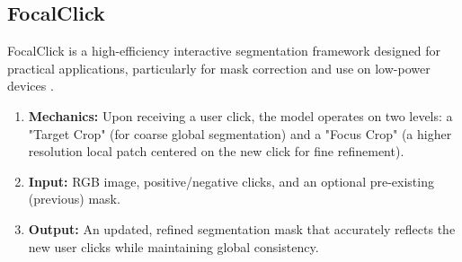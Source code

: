 \subsection{FocalClick}
FocalClick is a high-efficiency interactive segmentation framework designed for practical applications, particularly for mask correction and use on low-power devices \cite{focal_click_2022}.

\begin{enumerate}
	\item \textbf{Mechanics:} Upon receiving a user click, the model operates on two levels: a "Target Crop" (for coarse global segmentation) and a "Focus Crop" (a higher resolution local patch centered on the new click for fine refinement).
	
	\item \textbf{Input:} RGB image, positive/negative clicks, and an optional pre-existing (previous) mask.
	
	\item \textbf{Output:} An updated, refined segmentation mask that accurately reflects the new user clicks while maintaining global consistency.
\end{enumerate}